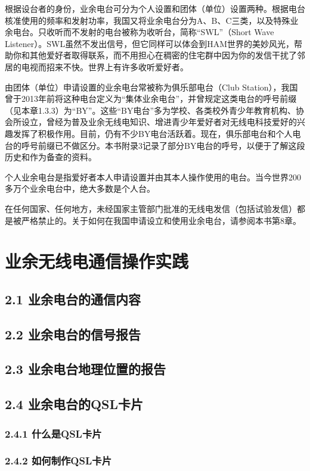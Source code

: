 \documentclass[12pt,UTF8]{ctexbook}
\begin{document}
根据设台者的身份，业余电台可分为个人设置和团体（单位）设置两种。根据电台核准使用的频率和发射功率，我国又将业余电台分为A、B、C三类，以及特殊业余电台。只收听而不发射的电台被称为收听台，简称“SWL”（Short Wave Listener）。SWL虽然不发出信号，但它同样可以体会到HAM世界的美妙风光，帮助你和其他爱好者取得联系，而不用担心在稠密的住宅群中因为你的发信干扰了邻居的电视而招来不快。世界上有许多收听爱好者。

由团体（单位）申请设置的业余电台常被称为俱乐部电台（Club Station），我国曾于2013年前将这种电台定义为“集体业余电台”，并曾规定这类电台的呼号前缀（见本章1.3.3）为“BY”。这些“BY电台”多为学校、各类校外青少年教育机构、协会所设立，曾经为普及业余无线电知识、增进青少年爱好者对无线电科技爱好的兴趣发挥了积极作用。目前，仍有不少BY电台活跃着。现在，俱乐部电台和个人电台的呼号前缀已不做区分。本书附录3记录了部分BY电台的呼号，以便于了解这段历史和作为备查的资料。

个人业余电台是指爱好者本人申请设置并由其本人操作使用的电台。当今世界200多万个业余电台中，绝大多数是个人台。

在任何国家、任何地方，未经国家主管部门批准的无线电发信（包括试验发信）都是被严格禁止的。关于如何在我国申请设立和使用业余电台，请参阅本书第8章。

\chapter{业余无线电通信操作实践}

\section{2.1 业余电台的通信内容}
\section{2.2 业余电台的信号报告}
\section{2.3 业余电台地理位置的报告}
\section{2.4 业余电台的QSL卡片}
\subsection{2.4.1 什么是QSL卡片}
\subsection{2.4.2 如何制作QSL卡片}
\end{document}
